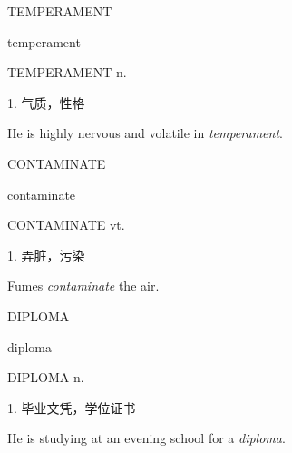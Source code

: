 \begin{flashcard}{
TEMPERAMENT

temperament
}
\begin{center}
TEMPERAMENT n. 
\end{center}
1. 气质，性格

He is highly nervous and volatile in \textit{temperament}.

\end{flashcard}
\begin{flashcard}{
CONTAMINATE

contaminate
}
\begin{center}
CONTAMINATE vt. 
\end{center}
1. 弄脏，污染

Fumes \textit{contaminate} the air.

\end{flashcard}
\begin{flashcard}{
DIPLOMA

diploma
}
\begin{center}
DIPLOMA n. 
\end{center}
1. 毕业文凭，学位证书

He is studying at an evening school for a \textit{diploma}.

\end{flashcard}
